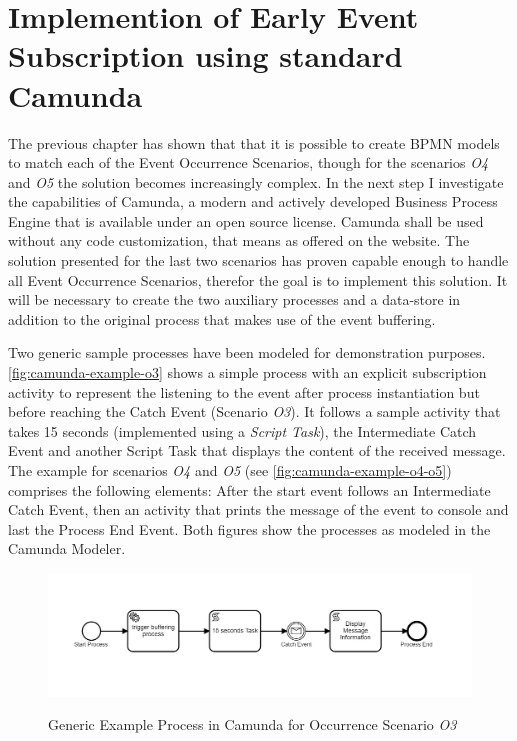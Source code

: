 

\section{Implemention of Early Event Subscription using standard Camunda}\label{ch:assessment-implementation}
The previous chapter has shown that that it is possible to create BPMN models to match each of the Event Occurrence Scenarios, though for the scenarios \textit{O4} and \textit{O5} the solution becomes increasingly complex.
In the next step I investigate the capabilities of Camunda, a modern and actively developed Business Process Engine that is available under an open source license.
Camunda shall be used without any code customization, that means as offered on the website.
The solution presented for the last two scenarios has proven capable enough to handle all Event Occurrence Scenarios, therefor the goal is to implement this solution. It will be necessary to create the two auxiliary processes and a data-store in addition to the original process that makes use of the event buffering.

Two generic sample processes have been modeled for demonstration purposes. \autoref{fig:camunda-example-o3} shows a simple process with an explicit subscription activity to represent the listening to the event after process instantiation but before reaching the Catch Event (Scenario \textit{O3}). It follows a sample activity that takes 15 seconds (implemented using a \textit{Script Task}), the Intermediate Catch Event and another Script Task that displays the content of the received message.
The example for scenarios \textit{O4} and \textit{O5} (see \autoref{fig:camunda-example-o4-o5}) comprises the following elements: After the start event follows an Intermediate Catch Event, then an activity that prints the message of the event to console and last the Process End Event. Both figures show the processes as modeled in the Camunda Modeler.

\begin{figure}[]
	\myfloatalign
	{\includegraphics[width=1\linewidth]{chapters/assessment/example-o3.PNG}}
	\caption{Generic Example Process in Camunda for Occurrence Scenario \textit{O3}}\label{fig:camunda-example-o3}
\end{figure}

